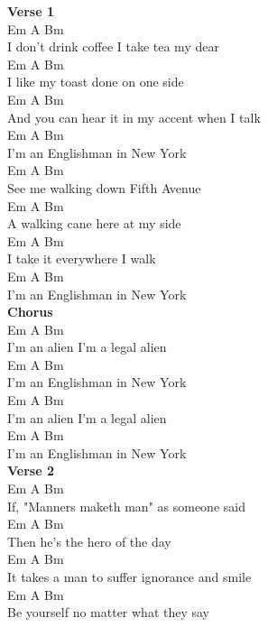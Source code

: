 \documentclass[a4paper]{article}
\begin{document}
    {
        \scriptsize
        \textbf{Verse 1}
        ~\\
        {
            \cutive
            \obeyspaces
Em               A          Bm
\\
I don't drink coffee I take tea my dear
\\
Em            A               Bm
\\
I like my toast done on one side
\\
Em          A               Bm
\\
And you can hear it in my accent when I talk
\\
       Em            A     Bm
\\
I'm an Englishman in New  York
\\
Em       A            Bm
\\
See me walking down Fifth Avenue
\\
Em         A               Bm
\\
A walking cane here at my side
\\
Em         A               Bm
\\
I take it everywhere I walk
\\
Em                A       Bm
\\
I'm an Englishman in New York
\\

        }
        \textbf{Chorus}
        ~\\
        {
            \cutive
            \obeyspaces
Em      A    Bm
\\
I'm an alien   I'm a legal alien
\\
        Em        A        Bm
\\
I'm an Englishman  in New York
\\
Em      A    Bm
\\
I'm an alien   I'm a legal alien
\\
        Em        A      Bm
\\
I'm an Englishman in New York
\\

        }
        \textbf{Verse 2}
        ~\\
        {
            \cutive
            \obeyspaces
Em                A                 Bm
\\
If, "Manners maketh man" as someone said
\\
Em            A           Bm
\\
Then he's the hero of the day
\\
Em                A             Bm
\\
It takes a man to suffer ignorance and smile
\\
       Em         A             Bm
\\
Be yourself no matter what they say
\\

}}
\end{document}
